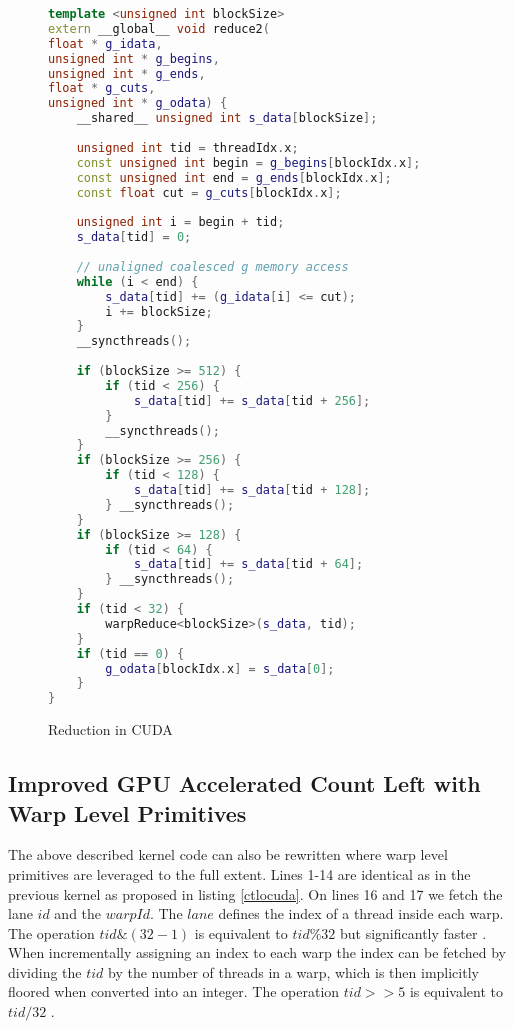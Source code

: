 \documentclass[]{article}
\begin{document}
\begin{figure}[H]
	\begin{lstlisting}[language=c++, caption=Kernel Optimized GPU Count Left, label = ctlocuda]
template <unsigned int blockSize>
extern __global__ void reduce2(
float * g_idata,
unsigned int * g_begins,
unsigned int * g_ends,
float * g_cuts,
unsigned int * g_odata) {
	__shared__ unsigned int s_data[blockSize];
	
	unsigned int tid = threadIdx.x;
	const unsigned int begin = g_begins[blockIdx.x];
	const unsigned int end = g_ends[blockIdx.x];
	const float cut = g_cuts[blockIdx.x];
	
	unsigned int i = begin + tid;
	s_data[tid] = 0;
	
	// unaligned coalesced g memory access
	while (i < end) {
		s_data[tid] += (g_idata[i] <= cut);
		i += blockSize;
	}
	__syncthreads();
	
	if (blockSize >= 512) {
		if (tid < 256) {
			s_data[tid] += s_data[tid + 256];
		}
		__syncthreads();
	}
	if (blockSize >= 256) {
		if (tid < 128) {
			s_data[tid] += s_data[tid + 128];
		} __syncthreads();
	}
	if (blockSize >= 128) {
		if (tid < 64) {
			s_data[tid] += s_data[tid + 64];
		} __syncthreads();
	}
	if (tid < 32) {
		warpReduce<blockSize>(s_data, tid);
	}
	if (tid == 0) {
		g_odata[blockIdx.x] = s_data[0];
	}
}
	\end{lstlisting}
	\caption{Reduction in CUDA}
	\label{cuda:reduction2}
\end{figure}


\subsection{Improved GPU Accelerated Count Left with Warp Level Primitives} \label{imprctlwrp}

The above described kernel code can also be rewritten where warp level primitives are leveraged to the full extent. Lines 1-14 are identical as in the previous kernel as proposed in listing \ref{ctlocuda}.
On lines 16 and 17 we fetch the lane $id$ and the $warpId$. The $lane$ defines the index of a thread inside each warp. The operation $tid \& (32 - 1)$ is equivalent to $tid \% 32$ but significantly faster \cite{bestp}.
When incrementally assigning an index to each warp the index can be fetched by dividing the $tid$ by the number of threads in a warp, which is then implicitly floored when converted into an integer. The operation $tid >> 5$ is equivalent to $tid / 32$ \cite{bestp}.
\end{document}
